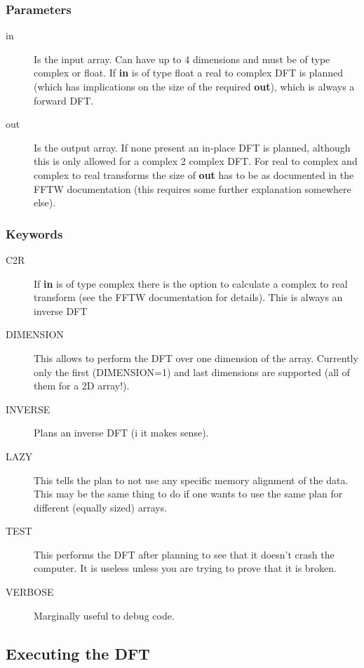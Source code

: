 \documentclass[a4paper,11pt]{article}
\begin{document}
\subsubsection*{Parameters}

\begin{description}
\item[in] Is the input array. Can have up to 4 dimensions and must be of type complex or float. If \textbf{in} is of type float a real to complex DFT is planned (which has implications on the size of the required \textbf{out}), which is always a forward DFT.
\item[out] Is the output array. If none present an in-place DFT is planned, although this is only allowed for a complex 2 complex DFT. For real to complex and complex to real transforms the size of \textbf{out} has to be as documented in the FFTW documentation (this requires some further explanation somewhere else).
\end{description}

\subsubsection*{Keywords}

\begin{description}
\item[C2R] If \textbf{in} is of type complex there is the option to calculate a complex to real transform (see the FFTW documentation for details). This is always an inverse DFT
\item[DIMENSION] This allows to perform the DFT over one dimension of the array. Currently only the first (DIMENSION=1) and last dimensions are supported (all of them for a 2D array!).
\item[INVERSE] Plans an inverse DFT (i it makes sense).
\item[LAZY] This tells the plan to not use any specific memory alignment of the data. This may be the same thing to do if one wants to use the same plan for different (equally sized) arrays.
\item[TEST] This performs the DFT after planning to see that it doesn't crash the computer. It is useless unless you are trying to prove that it is broken.
\item[VERBOSE] Marginally useful to debug code.
\end{description}


\subsection{Executing the DFT}
\end{document}
